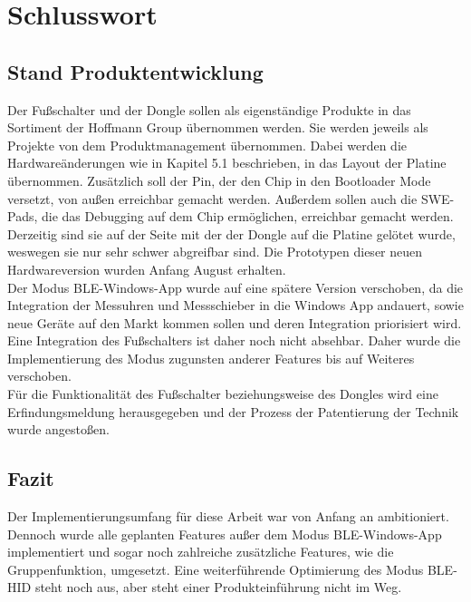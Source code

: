 \section{Schlusswort}

\subsection{Stand Produktentwicklung}
Der Fußschalter und der Dongle sollen als eigenständige Produkte in das Sortiment der Hoffmann Group übernommen werden. Sie werden jeweils als Projekte von dem Produktmanagement übernommen. Dabei werden die Hardwareänderungen wie in Kapitel 5.1 beschrieben, in das Layout der Platine übernommen. Zusätzlich soll der Pin, der den Chip in den Bootloader Mode versetzt, von außen erreichbar gemacht werden. Außerdem sollen auch die SWE-Pads, die das Debugging auf dem Chip ermöglichen, erreichbar gemacht werden. Derzeitig sind sie auf der Seite mit der der Dongle auf die Platine gelötet wurde, weswegen sie nur sehr schwer abgreifbar sind. Die Prototypen dieser neuen Hardwareversion wurden Anfang August erhalten.\\
Der Modus \ac{BLE}-Windows-App wurde auf eine spätere Version verschoben, da die Integration der Messuhren und Messschieber in die Windows App andauert, sowie neue Geräte auf den Markt kommen sollen und deren Integration priorisiert wird. Eine Integration des Fußschalters ist daher noch nicht absehbar. Daher wurde die Implementierung des Modus zugunsten anderer Features bis auf Weiteres verschoben.\\
Für die Funktionalität des Fußschalter beziehungsweise des Dongles wird eine Erfindungsmeldung herausgegeben und der Prozess der Patentierung der Technik wurde angestoßen.

\subsection{Fazit}
Der Implementierungsumfang für diese Arbeit war von Anfang an ambitioniert. Dennoch wurde alle geplanten Features außer dem Modus \ac{BLE}-Windows-App implementiert und sogar noch zahlreiche zusätzliche Features, wie die Gruppenfunktion, umgesetzt. Eine weiterführende Optimierung des Modus \ac{BLE}-\ac{HID} steht noch aus, aber steht einer Produkteinführung nicht im Weg.